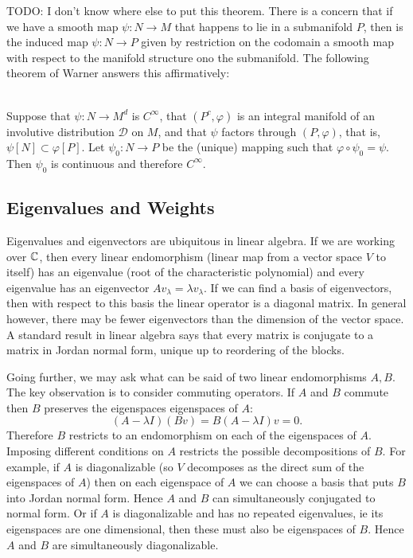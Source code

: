 TODO: I don't know where else to put this theorem.
There is a concern that if we have a smooth map $\psi: N \to M$ that happens to lie in a submanifold $P$, then is the induced map $\psi : N \to P$ given by restriction on the codomain a smooth map with respect to the manifold structure ono the submanifold.
The following theorem of Warner answers this affirmatively:
\begin{theorem}\label{theorem:cinfty}
\textup{\cite[1.62]{Warner1983}}\\
Suppose that $\psi \colon N \to M^d$ is $C^{\infty}$, that $(P^c,\varphi)$ is an integral manifold of an involutive distribution $\mathcal{D}$ on $M$, and that $\psi$ factors through $(P,\varphi)$, that is, $\psi[N] \subset \varphi[P]$. Let $\psi_0 : N \to P$ be the (unique) mapping such that $\varphi\circ \psi_0 = \psi$. Then $\psi_0$ is continuous and therefore $C^{\infty}$.
\end{theorem}

\subsection{Eigenvalues and Weights}

Eigenvalues and eigenvectors are ubiquitous in linear algebra.
If we are working over $\mathbb{C}$, then every linear endomorphism (linear map from a vector space $V$ to itself) has an eigenvalue (root of the characteristic polynomial) and every eigenvalue has an eigenvector $Av_\lambda = \lambda v_\lambda$.
If we can find a basis of eigenvectors, then with respect to this basis the linear operator is a diagonal matrix.
In general however, there may be fewer eigenvectors than the dimension of the vector space.
A standard result in linear algebra says that every matrix is conjugate to a matrix in Jordan normal form, unique up to reordering of the blocks.

Going further, we may ask what can be said of two linear endomorphisms $A,B$.
The key observation is to consider commuting operators.
If $A$ and $B$ commute then $B$ preserves the eigenspaces  eigenspaces of $A$:
\[
(A- \lambda I) (Bv) 
= B(A- \lambda I) v
= 0.
\]
Therefore $B$ restricts to an endomorphism on each of the eigenspaces of $A$.
Imposing different conditions on $A$ restricts the possible decompositions of $B$.
For example, if $A$ is diagonalizable (so $V$ decomposes as the direct sum of the eigenspaces of $A$) then on each eigenspace of $A$ we can choose a basis that puts $B$ into Jordan normal form.
Hence $A$ and $B$ can simultaneously conjugated to normal form.
Or if $A$ is diagonalizable and has no repeated eigenvalues, ie its eigenspaces are one dimensional, then these must also be eigenspaces of $B$.
Hence $A$ and $B$ are simultaneously diagonalizable.

